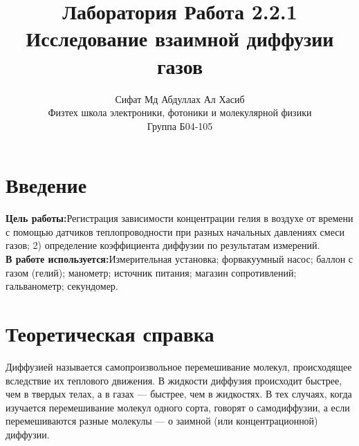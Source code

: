 \documentclass[a4paper, 12pt]{article}%
\author{Сифат Мд Абдуллах Ал Хасиб \\
Физтех школа электроники, фотоники и молекулярной физики \\
Группа Б04-105}
\title{\textbf{Лаборатория Работа 2.2.1 \\ 
Исследование взаимной диффузии газов}}
\begin{document}
\maketitle
\section{Введение}\textbf{Цель работы:}Регистрация  зависимости  концентрации   гелия в воздухе от времени с помощью датчиков теплопроводности при разных начальных давлениях смеси газов; 2) определение коэффициента диффузии по результатам измерений.\\
\textbf{В работе используется:}Измерительная установка; форвакуумный насос; баллон с газом (гелий); манометр; источник питания; магазин сопротивлений; гальванометр; секундомер.
\section{Теоретическая справка} 
Диффузией называется самопроизвольное перемешивание молекул, происходящее вследствие их теплового движения. В жидкости
диффузия происходит быстрее, чем в твердых телах, а в газах --- быстрее, чем в жидкостях. В тех случаях, когда изучается перемешивание молекул одного сорта, говорят о самодиффузии, а если перемешиваются разные молекулы --- о заимной (или концентрационной)
диффузии.
\end{document}
